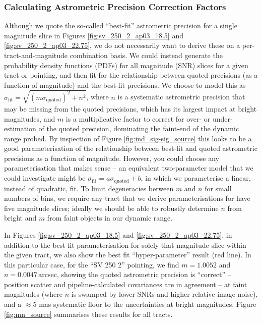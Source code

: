 \documentclass[SE,authoryear,toc]{lsstdoc}
\begin{document}
\subsubsection{Calculating Astrometric Precision Correction Factors}
Although we quote the so-called ``best-fit'' astrometric precision for a single magnitude slice in Figures \ref{fig:sv_250_2_ap03_18.5} and \ref{fig:sv_250_2_ap03_22.75}, we do not necessarily want to derive these on a per-tract-and-magnitude combination basis.
We could instead generate the probability density functions (PDFs) for all magnitude (SNR) slices for a given tract or pointing, and then fit for the relationship between quoted precisions (as a function of magnitude) and the best-fit precisions.
We choose to model this as $\sigma_\mathrm{fit} = \sqrt{(m \sigma_\mathrm{quoted})^2 + n^2}$, where $n$ is a systematic astrometric precision that may be missing from the quoted precisions, which has its largest impact at bright magnitudes, and $m$ is a multiplicative factor to correct for over- or under-estimation of the quoted precision, dominating the faint-end of the dynamic range probed.
By inspection of Figure \ref{fig:ind_sig-sig_source} this looks to be a good parameterisation of the relationship between best-fit and quoted astrometric precisions as a function of magnitude.
However, you could choose any parameterisation that makes sense -- an equivalent two-parameter model that we could investigate might be $\sigma_\mathrm{fit} = a \sigma_\mathrm{quoted} + b$, in which we parameterise a linear, instead of quadratic, fit.
To limit degeneracies between $m$ and $n$ for small numbers of bins, we require any tract that we derive parameterisations for have five magnitude slices; ideally we should be able to robustly determine $n$ from bright and $m$ from faint objects in our dynamic range.

In Figures \ref{fig:sv_250_2_ap03_18.5} and \ref{fig:sv_250_2_ap03_22.75}, in addition to the best-fit parameterisation for solely that magnitude slice within the given tract, we also show the best fit ``hyper-parameter'' result (red line).
In this particular case, for the ``SV 250 2'' pointing, we find $m = 1.0052$ and $n = 0.0047\,\mathrm{arcsec}$, showing the quoted astrometric precision is ``correct'' -- position scatter and pipeline-calculated covariances are in agreement -- at faint magnitudes (where $n$ is swamped by lower SNRs and higher relative image noise), and a $\approx$5 mas systematic floor to the uncertainties at bright magnitudes.
Figure \ref{fig:mn_source} summarises these results for all tracts.
\end{document}

